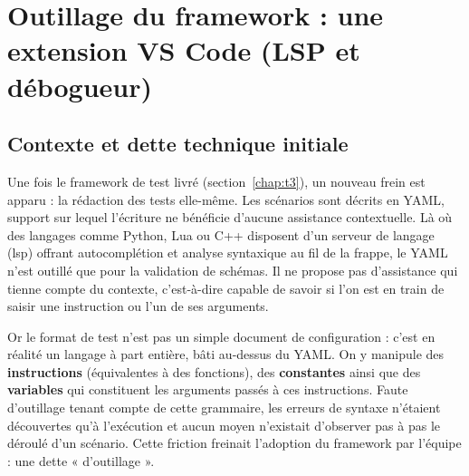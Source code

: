 \section{Outillage du framework : une extension VS Code (LSP et débogueur)}
\label{chap:t4}


\subsection{Contexte et dette technique initiale}
Une fois le framework de test livré (section~\ref{chap:t3}), un nouveau
frein est apparu : la rédaction des tests elle-même. Les scénarios sont décrits
en YAML, support sur lequel l'écriture ne bénéficie d'aucune assistance
contextuelle. Là où des langages comme Python, Lua ou C++ disposent d'un serveur
de langage (\gls{lsp}) offrant autocomplétion et analyse syntaxique au fil de la
frappe, le YAML n'est outillé que pour la validation de schémas. Il ne propose
pas d'assistance qui tienne compte du contexte, c'est-à-dire capable de savoir
si l'on est en train de saisir une instruction ou l'un de ses arguments.

Or le format de test n'est pas un simple document de configuration : c'est en
réalité un langage à part entière, bâti au-dessus du YAML. On y manipule des
\textbf{instructions} (équivalentes à des fonctions), des \textbf{constantes}
ainsi que des \textbf{variables} qui constituent les arguments passés à ces
instructions. Faute d'outillage tenant compte de cette grammaire, les erreurs de
syntaxe n'étaient découvertes qu'à l'exécution et aucun moyen n'existait
d'observer pas à pas le déroulé d'un scénario. Cette friction freinait l'adoption
du framework par l'équipe : une dette « d'outillage ».

